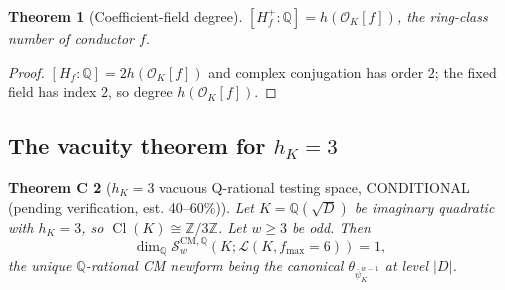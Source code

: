 \documentclass[11pt,a4paper]{amsart}
\newtheorem{theorem}{Theorem}[section]
\newtheorem{theoremC}[theorem]{Theorem C}
\theoremstyle{definition}
\DeclareMathOperator{\Cl}{Cl}
\newcommand{\Q}{\mathbb{Q}}
\newcommand{\Z}{\mathbb{Z}}
\newcommand{\OK}{\mathcal{O}_K}
\newcommand{\Lcal}{\mathcal{L}}
\newcommand{\Scal}{\mathcal{S}}
\newcommand{\hK}{h_{K}}
\begin{document}
\begin{theorem}[Coefficient-field degree]\label{thm:coef-field-deg}
$[H_f^+ : \Q] = h(\OK[f])$, the ring-class number of conductor $f$.
\end{theorem}

\begin{proof}
$[H_f : \Q] = 2 h(\OK[f])$ and complex conjugation has order $2$; the fixed field has index $2$, so degree $h(\OK[f])$.
\end{proof}

\subsection{The vacuity theorem for $\hK = 3$}\label{sec:vacuity-hK3}

\begin{theoremC}[$\hK = 3$ vacuous Q-rational testing space, CONDITIONAL (pending verification, est. 40--60\%)]\label{thm:C}
Let $K = \Q(\sqrt{D})$ be imaginary quadratic with $\hK = 3$, so $\Cl(K) \cong \Z/3\Z$. Let $w \ge 3$ be odd. Then
\[
\dim_\Q \Scal_w^{\mathrm{CM}, \Q}(K; \Lcal(K, f_{\max} = 6)) = 1,
\]
the unique $\Q$-rational CM newform being the canonical $\theta_{\bar\psi_K^{w-1}}$ at level $|D|$.
\end{theoremC}
\end{document}
